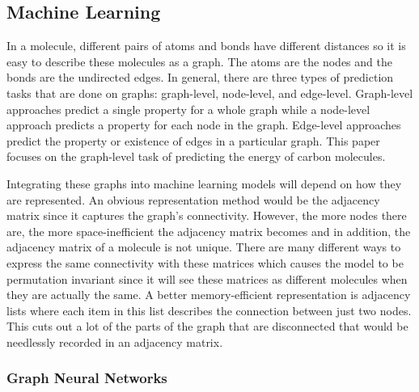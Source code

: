 \documentclass[12pt]{scrartcl}
\begin{document}
\newpage


\subsection{Machine Learning}

In a molecule, different pairs of atoms and bonds have different distances so it is easy to describe
these molecules as a graph. The atoms are the nodes and the bonds are the undirected edges. In general, 
there are three types of prediction tasks that are done on graphs: graph-level, node-level, and edge-level. 
Graph-level approaches predict a single property for a whole graph while a node-level approach predicts 
a property for each node in the graph. Edge-level approaches predict the property or existence of edges 
in a particular graph. This paper focuses on the graph-level task of predicting the energy of carbon 
molecules. 

Integrating these graphs into machine learning models will depend on how they are represented. 
An obvious representation method would be the adjacency matrix since it captures the graph's connectivity. 
However, the more nodes there are, the more space-inefficient the adjacency matrix becomes and in addition,
the adjacency matrix of a molecule is not unique. There are many different ways to express the same 
connectivity with these matrices which causes the model to be permutation invariant since it will see 
these matrices as different molecules when they are actually the same. A better memory-efficient representation 
is adjacency lists where each item in this list describes the connection between just two nodes. This cuts out 
a lot of the parts of the graph that are disconnected that would be needlessly recorded in an adjacency matrix.


\subsubsection{Graph Neural Networks}    
\end{document}
